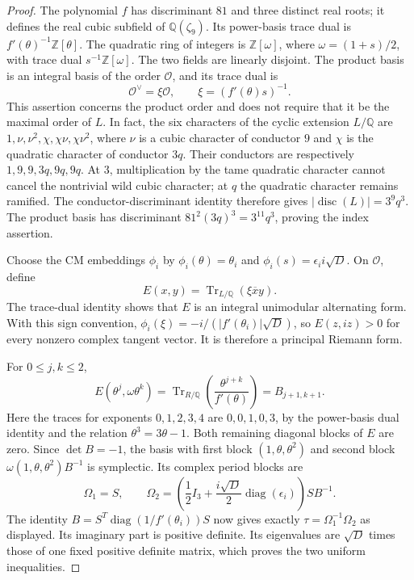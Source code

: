 \documentclass[11pt]{article}
\theoremstyle{definition}
\theoremstyle{remark}
\begin{document}
\begin{proof}
The polynomial \(f\) has discriminant \(81\) and three distinct
real roots; it defines the real cubic subfield of
\(\mathbb Q(\zeta_9)\). Its power-basis trace dual is
\(f'(\theta)^{-1}\mathbb Z[\theta]\).
The quadratic ring of integers is
\(\mathbb Z[\omega]\), where \(\omega=(1+s)/2\), with trace
dual \(s^{-1}\mathbb Z[\omega]\).
The two fields are linearly disjoint. The product basis is an
integral basis of the order \(\mathcal O\), and its trace dual
is
\[
 \mathcal O^\vee=\xi\mathcal O,
 \qquad \xi=(f'(\theta)s)^{-1}.
\]
This assertion concerns the product order and does not require
that it be the maximal order of \(L\).
In fact, the six characters of the cyclic extension \(L/\mathbb Q\)
are \(1,\nu,\nu^2,\chi,\chi\nu,\chi\nu^2\), where \(\nu\) is a
cubic character of conductor \(9\) and \(\chi\) is the quadratic
character of conductor \(3q\). Their conductors are respectively
\(1,9,9,3q,9q,9q\). At \(3\), multiplication by the tame quadratic
character cannot cancel the nontrivial wild cubic character; at \(q\)
the quadratic character remains ramified. The conductor-discriminant
identity therefore gives \(|\operatorname{disc}(L)|=3^9q^3\).
The product basis has discriminant
\(81^2(3q)^3=3^{11}q^3\), proving the index assertion.

Choose the CM embeddings \(\phi_i\) by
\(\phi_i(\theta)=\theta_i\) and
\(\phi_i(s)=\epsilon_i i\sqrt D\).
On \(\mathcal O\), define
\[
 E(x,y)=\operatorname{Tr}_{L/\mathbb Q}(\xi\overline{x}y).
\]
The trace-dual identity shows that \(E\) is an integral
unimodular alternating form. With this sign convention,
\(\phi_i(\xi)=-i/(|f'(\theta_i)|\sqrt D)\), so
\(E(z,iz)>0\) for every nonzero complex tangent vector.
It is therefore a principal Riemann form.

For \(0\leq j,k\leq2\),
\[
 E(\theta^j,\omega\theta^k)
 =\operatorname{Tr}_{R/\mathbb Q}
             \left(\frac{\theta^{j+k}}{f'(\theta)}\right)
 =B_{j+1,k+1}.
\]
Here the traces for exponents \(0,1,2,3,4\) are
\(0,0,1,0,3\), by the power-basis dual identity and the
relation \(\theta^3=3\theta-1\).
Both remaining diagonal blocks of \(E\) are zero.
Since \(\det B=-1\), the basis with first block
\((1,\theta,\theta^2)\) and second block
\(\omega(1,\theta,\theta^2)B^{-1}\) is symplectic.
Its complex period blocks are
\[
 \Omega_1=S,\qquad
 \Omega_2=
 \left(\frac12 I_3+\frac{i\sqrt D}{2}
                        \operatorname{diag}(\epsilon_i)\right)
 S B^{-1}.
\]
The identity
\(B=S^T\operatorname{diag}(1/f'(\theta_i))S\)
now gives exactly \(\tau=\Omega_1^{-1}\Omega_2\) as displayed.
Its imaginary part is positive definite. Its eigenvalues are
\(\sqrt D\) times those of one fixed positive definite matrix,
which proves the two uniform inequalities.


\end{proof}
\end{document}
